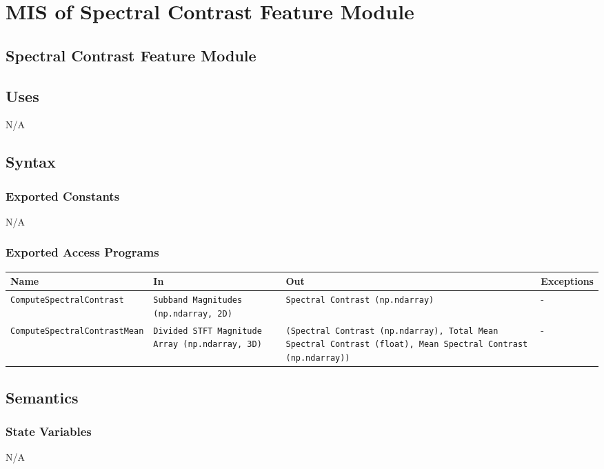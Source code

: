 \documentclass[12pt, titlepage]{article}
\begin{document}
{\color{red}
\section{MIS of Spectral Contrast Feature Module}

\subsection{Spectral Contrast Feature Module}

\subsection{Uses}
N/A

\subsection{Syntax}

\subsubsection{Exported Constants}
N/A

\subsubsection{Exported Access Programs}

\begin{center}
  \begin{tabular}{|p{6cm}|p{4cm}|p{3cm}|p{2cm}|}
  \hline
  \textbf{Name} & \textbf{In} & \textbf{Out} & \textbf{Exceptions} \\
  \hline
  \texttt{ComputeSpectralContrast} & \texttt{Subband Magnitudes (np.ndarray, 2D)} & \texttt{Spectral Contrast (np.ndarray)} & - \\
  \hline
  \texttt{ComputeSpectralContrastMean} & \texttt{Divided STFT Magnitude Array (np.ndarray, 3D)} & \texttt{(Spectral Contrast (np.ndarray), Total Mean Spectral Contrast (float), Mean Spectral Contrast (np.ndarray))} & - \\
  \hline
  \end{tabular}
\end{center}

\subsection{Semantics}

\subsubsection{State Variables}
N/A

}
\end{document}

